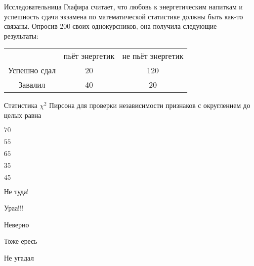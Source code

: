 
\begin{question}
Исследовательница Глафира считает, что любовь к энергетическим напиткам
и успешность сдачи экзамена по математической статистике должны быть
как-то связаны. Опросив 200 своих однокурсников, она получила следующие
результаты:

\begin{tabular}{ccc}
\toprule
 & пьёт энергетик & не пьёт энергетик \\
Успешно сдал & 20 & 120 \\
Завалил  & 40 & 20 \\
\bottomrule
\end{tabular}

Статистика \(\chi^2\) Пирсона для проверки независимости признаков с
округлением до целых равна
\begin{answerlist}
  \item \(70\)
  \item \(55\)
  \item \(65\)
  \item \(35\)
  \item \(45\)
\end{answerlist}
\end{question}

\begin{solution}
\begin{answerlist}
  \item Не туда!
  \item Ураа!!!
  \item Неверно
  \item Тоже ересь
  \item Не угадал
\end{answerlist}
\end{solution}

